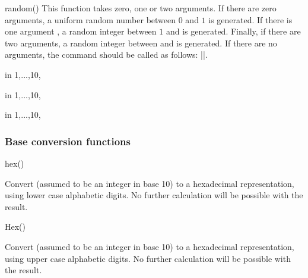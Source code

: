 \begin{math-function}{random()}
\mathcommand
  This function takes zero, one or two arguments. If there are zero
  arguments, a uniform random number between $0$ and $1$ is generated. If there is
  one argument , a random integer between $1$ and  is
  generated. Finally, if there are two arguments, a random integer
  between  and  is generated. If there are no
  arguments, the \pgfname{} command should be called as follows:
  |\pgfmathrandom{}|.

\begin{codeexample}[]
\foreach \x in {1,...,10}{\pgfmathresult, }
\end{codeexample}

\begin{codeexample}[]
\foreach \x in {1,...,10}{\pgfmathresult, }
\end{codeexample}

\begin{codeexample}[]
\foreach \x in {1,...,10}{\pgfmathresult, }
\end{codeexample}
\end{math-function}

\subsubsection{Base conversion functions}

\label{pgfmath-functions-base}

\begin{math-function}{hex()}
\mathcommand

  Convert  (assumed to be an integer in base 10) to a
  hexadecimal representation, using lower case alphabetic digits.
	No further calculation will be possible with the result.
	
\begin{codeexample}[]
 \pgfmathresult
\end{codeexample}
\end{math-function}

\begin{math-function}{Hex()}
\mathcommand

  Convert  (assumed to be an integer in base 10) to a
  hexadecimal representation, using upper case alphabetic digits.
  No further calculation will be possible with the result.

\begin{codeexample}[]
 \pgfmathresult
\end{codeexample}
\end{math-function}

